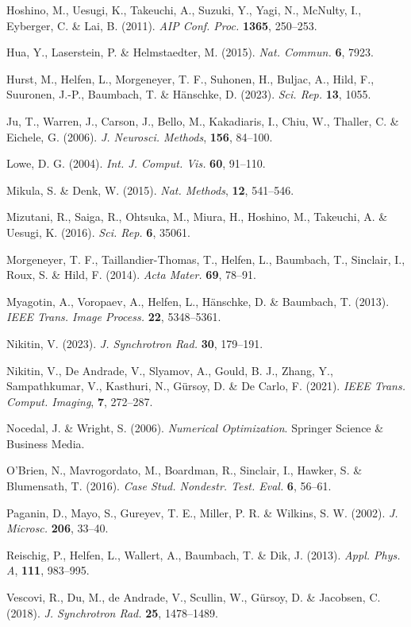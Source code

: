 \documentclass{article}
\begin{document}
\begin{hangpars}
Hoshino, M., Uesugi, K., Takeuchi, A., Suzuki, Y., Yagi, N., McNulty, I., Eyberger, C. \& Lai, B. (2011). \emph{AIP Conf. Proc.} \textbf{1365}, 250–253.

Hua, Y., Laserstein, P. \& Helmstaedter, M. (2015). \emph{Nat. Commun.} \textbf{6}, 7923.

Hurst, M., Helfen, L., Morgeneyer, T. F., Suhonen, H., Buljac, A., Hild, F., Suuronen, J.-P., Baumbach, T. \& Hänschke, D. (2023). \emph{Sci. Rep.} \textbf{13}, 1055.

Ju, T., Warren, J., Carson, J., Bello, M., Kakadiaris, I., Chiu, W., Thaller, C. \& Eichele, G. (2006). \emph{J. Neurosci. Methods}, \textbf{156}, 84–100.

Lowe, D. G. (2004). \emph{Int. J. Comput. Vis.} \textbf{60}, 91–110.

Mikula, S. \& Denk, W. (2015). \emph{Nat. Methods}, \textbf{12}, 541–546.

Mizutani, R., Saiga, R., Ohtsuka, M., Miura, H., Hoshino, M., Takeuchi, A. \& Uesugi, K. (2016). \emph{Sci. Rep.} \textbf{6}, 35061.

Morgeneyer, T. F., Taillandier-Thomas, T., Helfen, L., Baumbach, T., Sinclair, I., Roux, S. \& Hild, F. (2014). \emph{Acta Mater.} \textbf{69}, 78–91.

Myagotin, A., Voropaev, A., Helfen, L., Hänschke, D. \& Baumbach, T. (2013). \emph{IEEE Trans. Image Process.} \textbf{22}, 5348–5361.

Nikitin, V. (2023). \emph{J. Synchrotron Rad.} \textbf{30}, 179–191.

Nikitin, V., De Andrade, V., Slyamov, A., Gould, B. J., Zhang, Y., Sampathkumar, V., Kasthuri, N., Gürsoy, D. \& De Carlo, F. (2021). \emph{IEEE Trans. Comput. Imaging}, \textbf{7}, 272–287.

Nocedal, J. \& Wright, S. (2006). \emph{Numerical Optimization}. Springer Science \& Business Media.

O’Brien, N., Mavrogordato, M., Boardman, R., Sinclair, I., Hawker, S. \& Blumensath, T. (2016). \emph{Case Stud. Nondestr. Test. Eval.} \textbf{6}, 56–61.

Paganin, D., Mayo, S., Gureyev, T. E., Miller, P. R. \& Wilkins, S. W. (2002). \emph{J. Microsc.} \textbf{206}, 33–40.

Reischig, P., Helfen, L., Wallert, A., Baumbach, T. \& Dik, J. (2013). \emph{Appl. Phys. A}, \textbf{111}, 983–995.

Vescovi, R., Du, M., de Andrade, V., Scullin, W., Gürsoy, D. \& Jacobsen, C. (2018). \emph{J. Synchrotron Rad.} \textbf{25}, 1478–1489.


\end{hangpars}
\end{document}
